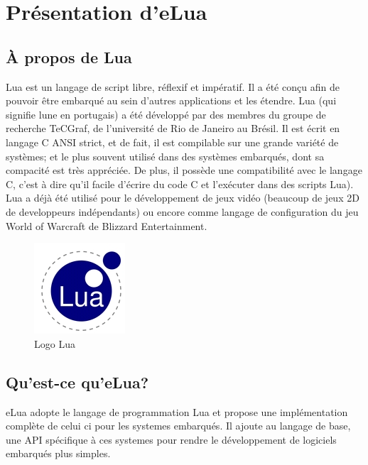 \chapter[Présentation d’eLua]{Présentation d’eLua}
\label{chap:chap3}

\section{À propos de Lua}

Lua est un langage de script libre, réflexif et impératif. Il a été conçu afin de pouvoir être embarqué au sein d'autres applications et les étendre.
Lua (qui signifie lune en portugais) a été développé par des membres du groupe de recherche TeCGraf, de l'université de Rio de Janeiro au Brésil.
Il est écrit en langage C ANSI strict, et de fait, il est compilable sur une grande variété de systèmes; et le plus souvent utilisé dans des systèmes
embarqués, dont sa compacité est très appréciée. De plus, il possède une compatibilité avec le langage C, c'est à dire qu'il facile d'écrire du code
C et l'exécuter dans des scripts Lua). Lua a déjà été utilisé pour le développement de jeux vidéo (beaucoup de jeux 2D de developpeurs indépendants)
ou encore comme langage de configuration du jeu World of Warcraft de Blizzard Entertainment.

\begin{figure}[h]
\begin{center}
\includegraphics[scale=1]{../images/eLua/Lua.JPG}
\caption{Logo Lua}
\end{center}
\end{figure}


\section{Qu'est-ce qu'eLua?}

  eLua adopte le langage de programmation Lua et propose une implémentation complète de celui ci pour les systemes embarqués. Il ajoute au langage de base,
une API spécifique à ces systemes pour rendre le développement de logiciels embarqués plus simples.

